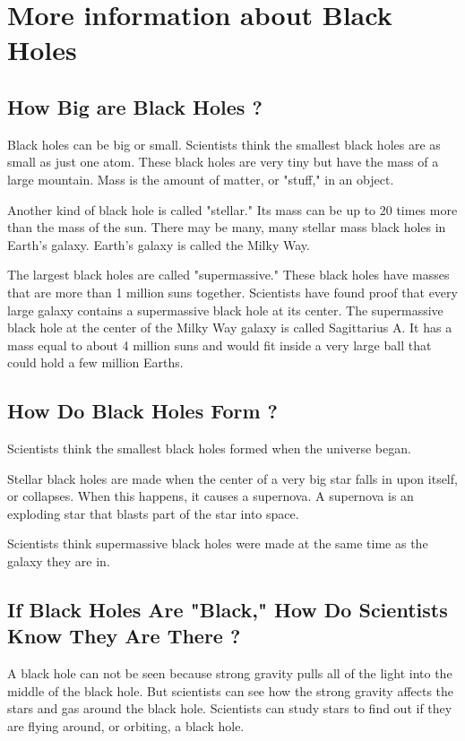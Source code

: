 \documentclass[../tuto-3.tex]{subfiles}
\begin{document}
	
	\section{More information about Black Holes}
	
	\subsection{How Big are Black Holes ?}
	Black holes can be big or small. Scientists think the smallest black holes are as small as just one atom. These black holes are very tiny but have the mass of a large mountain. Mass is the amount of matter, or "stuff," in an object.
	
	Another kind of black hole is called "stellar." Its mass can be up to 20 times more than the mass of the sun. There may be many, many stellar mass black holes in Earth's galaxy. Earth's galaxy is called the Milky Way.
	
	The largest black holes are called "supermassive." These black holes have masses that are more than 1 million suns together. Scientists have found proof that every large galaxy contains a supermassive black hole at its center. The supermassive black hole at the center of the Milky Way galaxy is called Sagittarius A. It has a mass equal to about 4 million suns and would fit inside a very large ball that could hold a few million Earths.
	
	\subsection{How Do Black Holes Form ?}
	Scientists think the smallest black holes formed when the universe began.
	
	Stellar black holes are made when the center of a very big star falls in upon itself, or collapses. When this happens, it causes a supernova. A supernova is an exploding star that blasts part of the star into space.
	
	Scientists think supermassive black holes were made at the same time as the galaxy they are in.
	
	\subsection{If Black Holes Are "Black," How Do Scientists Know They Are There ?}
	A black hole can not be seen because strong gravity pulls all of the light into the middle of the black hole. But scientists can see how the strong gravity affects the stars and gas around the black hole. Scientists can study stars to find out if they are flying around, or orbiting, a black hole.
	
\end{document}
